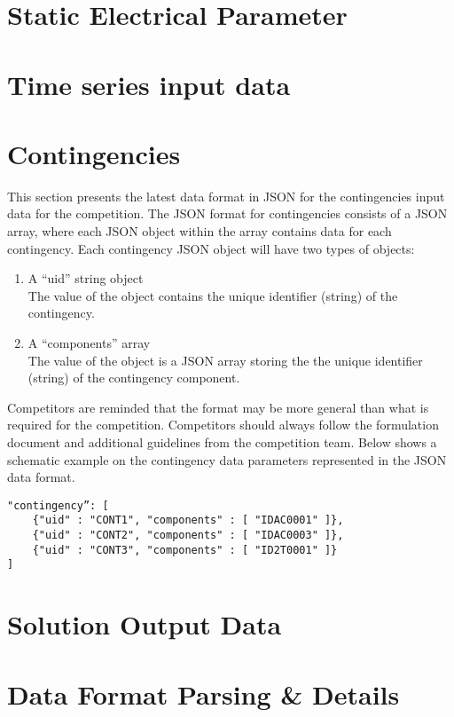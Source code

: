 \documentclass{article}
\begin{document}
\section{Static Electrical Parameter}
\label{sec:format_spec}



\section{Time series input data}


\section{Contingencies}
\label{sec:contingency}
This section presents the latest data format in JSON for the contingencies input data for the competition.
The JSON format for contingencies consists of a JSON array,
where each JSON object within the array contains data for each contingency.
Each contingency JSON object will have two types of objects:
\begin{enumerate}
    \item A ``uid'' string object \\
    The value of the object contains the unique identifier (string) of the contingency. 
    \item A ``components'' array \\
    The value of the object is a JSON array storing the the unique identifier (string) of the contingency component.
\end{enumerate}
Competitors are reminded that the format may be more general than 
what is required for the competition. 
Competitors should always
follow the formulation document and additional guidelines from the competition team.
Below shows a schematic example on the contingency data parameters represented in the JSON data format. 
\begin{verbatim}
"contingency”: [
    {"uid" : "CONT1", "components" : [ "IDAC0001" ]},
    {"uid" : "CONT2", "components" : [ "IDAC0003" ]},
    {"uid" : "CONT3", "components" : [ "ID2T0001" ]}    
]    
\end{verbatim}



\section{Solution Output Data}


\section{Data Format Parsing \& Details}

\end{document}
